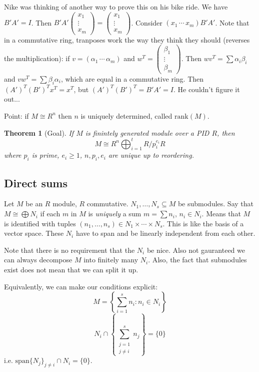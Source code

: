 \documentclass{article}
\theoremstyle{plain}
\newtheorem{theorem}{Theorem}
\theoremstyle{remark}
\begin{document}
Nike was thinking of another way to prove this on his bike ride.
We have $B'A' = I$.
Then $B'A'\begin{pmatrix} x_1 \\ \vdots \\ x_m \end{pmatrix} =
\begin{pmatrix} x_1 \\ \vdots \\ x_m \end{pmatrix}$.
Consider $(x_1 \, \cdots \, x_m) B'A'$.
Note that in a commutative ring, tranposes work the way they think they should
(reverses the multiplication):
if $v = (\alpha_1 \, \cdots \, \alpha_m)$ and
$w^T = \begin{pmatrix} \beta_1 \\ \vdots \\ \beta_m \end{pmatrix}$.
Then $wv^T = \sum \alpha_i \beta_i$ and $vw^T = \sum \beta_i \alpha_i$,
which are equal in a commutative ring.
Then $(A')^T(B')^Tx^T = x^T$, but $(A')^T(B')^T = B'A' = I$.
He couldn't figure it out...

Point: if $M \cong R^n$ then $n$ is uniquely determined, called $\mathrm{rank}(M)$.
\begin{theorem}[Goal]
	If $M$ is finintely generated module over a PID $R$, then
	\[
		M \cong R^n \bigoplus_{i=1}^t R/p_i^{e_i}R
	\]
	where $p_i$ is prime, $e_i \geq 1$, $n,p_i,e_i$ are unique up to reordering.
\end{theorem}

\subsection{Direct sums}
Let $M$ be an $R$ module, $R$ commutative.
$N_1,\dots,N_s \subseteq M$ be submodules.
Say that $M \cong \bigoplus N_i$ if each $m$ in $M$
is \emph{uniquely} a sum $m = \sum n_i$, $n_i \in N_i$.
Means that $M$ is identified with tuples $(n_1,\dots,n_s) \in N_1 \times \cdots \times N_s$.
This is like the basis of a vector space.
These $N_i$ have to span and be linearly independent from each other.

Note that there is no requirement that the $N_i$ be nice.
Also not gauranteed we can always decompose $M$ into finitely many $N_i$.
Also, the fact that submodules exist does not mean that we can split it up.

Equivalently, we can make our conditions explicit:
\[
	M = \left\{ \sum_{i=1}^s n_i \colon n_i \in N_i\right\}
\]
\[
	N_i \cap \left\{\sum_{\substack{j=1\\j\neq i}}^s n_j\right\} = \{0\}
\]
i.e. $\mathrm{span}\{N_j\}_{j\neq i} \cap N_i = \{0\}$.
\end{document}
